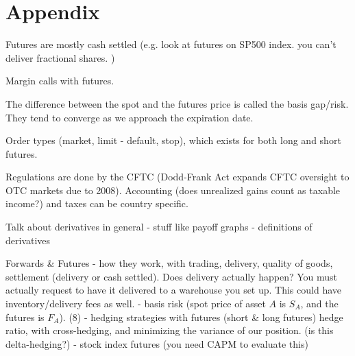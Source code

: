 \documentclass{article}
\begin{document}
\section{Appendix}

  Futures are mostly cash settled (e.g. look at futures on SP500 index. you can't deliver fractional shares. )

  Margin calls with futures. 

  The difference between the spot and the futures price is called the basis gap/risk. They tend to converge as we approach the expiration date. 

  Order types (market, limit - default, stop), which exists for both long and short futures. 

  Regulations are done by the CFTC (Dodd-Frank Act expands CFTC oversight to OTC markets due to 2008). Accounting (does unrealized gains count as taxable income?) and taxes can be country specific. 

  Talk about derivatives in general 
  - stuff like payoff graphs 
  - definitions of derivatives 

  Forwards \& Futures 
  - how they work, with trading, delivery, quality of goods, settlement (delivery or cash settled). Does delivery actually happen? You must actually request to have it delivered to a warehouse you set up. This could have inventory/delivery fees as well.  
  - basis risk (spot price of asset $A$ is $S_A$, and the futures is $F_A$). (8)
  - hedging strategies with futures (short \& long futures) hedge ratio, with cross-hedging, and minimizing the variance of our position. (is this delta-hedging?) 
  - stock index futures (you need CAPM to evaluate this)
\end{document}
